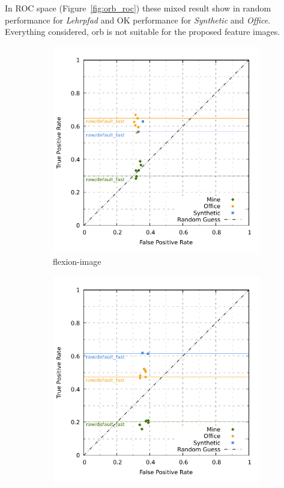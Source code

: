 In \acrshort{ROC} space (Figure~\ref{fig:orb_roc}) these mixed result show in random performance for \emph{Lehrpfad} and OK performance for \emph{Synthetic} and \emph{Office}.
Everything considered, \acrshort{orb} is not suitable for the proposed feature images.
\begin{figure}[htp]
\begin{subfigure}[t]{0.45\linewidth}
    \includegraphics[width=\linewidth]{chapter06/results/ORB/flexion/roc.pdf}%
    \caption{\gls{flexion-image}}
\end{subfigure}\quad
\begin{subfigure}[t]{0.45\linewidth}
    \includegraphics[width=\linewidth]{chapter06/results/ORB/bearing/roc.pdf}

\end{subfigure}
\end{figure}
